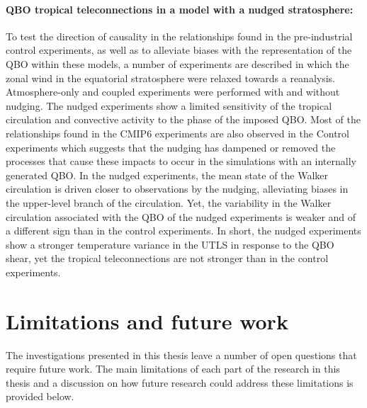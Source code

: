 \paragraph{QBO tropical teleconnections in a model with a nudged stratosphere:}
To test the direction of causality in the relationships found in the pre-industrial control experiments, as well as to alleviate biases with the representation of the QBO within these models, a number of experiments are described in which the zonal wind in the equatorial stratosphere were relaxed towards a reanalysis. 
Atmosphere-only and coupled experiments were performed with and without nudging. 
The nudged experiments show a limited sensitivity of the tropical circulation and convective activity to the phase of the imposed QBO.
Most of the relationships found in the CMIP6 experiments are also observed in the Control experiments which suggests that the nudging has dampened or removed the processes that cause these impacts to occur in the simulations with an internally generated QBO. 
In the nudged experiments, the mean state of the Walker circulation is driven closer to observations by the nudging, alleviating biases in the upper-level branch of the circulation. Yet, the variability in the Walker circulation associated with the QBO of the nudged experiments is weaker and of a different sign than in the control experiments.
In short, the nudged experiments show a stronger temperature variance in the UTLS in response to the QBO shear, yet the tropical teleconnections are not stronger than in the control experiments. 

\section{Limitations and future work}

The investigations presented in this thesis leave a number of open questions that require future work. 
The main limitations of each part of the research in this thesis and a discussion on how future research could address these limitations is provided below. 

